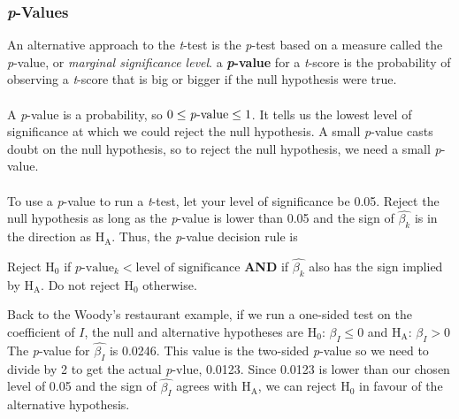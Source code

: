 \documentclass[11pt]{article}
\begin{document}
\subsubsection{\textit{p}-Values}
An alternative approach to the \textit{t}-test is the 	\textit{p}-test based on a measure called the 	\textit{p}-value, or \textit{marginal significance level}. a \textbf{\textit{p}-value} for a \textit{t}-score is the probability of observing a \textit{t}-score that is big or bigger if the null hypothesis were true. \\ \\
A \textit{p}-value is a probability, so $0 \leq \text{\textit{p}-value} \leq 1$. It tells us the lowest level of significance at which we could reject the null hypothesis. A small \textit{p}-value casts doubt on the null hypothesis, so to reject the null hypothesis, we need a small \textit{p}-value.\\ \\
To use a \textit{p}-value to run a \textit{t}-test, let your level of significance be 0.05. Reject the null hypothesis as long as the \textit{p}-value is lower than 0.05 and the sign of $\hat{\beta_k}$ is in the direction as H$_\text{A}$. Thus, the \textit{p}-value decision rule is
\begin{framed}Reject H$_0$ if  $p\text{-value}_k < \text{level of significance}$ \textbf{AND} if $\hat{\beta_k}$ also has the sign implied by H$_\text{A}$. Do not reject H$_0$ otherwise.
\end{framed}
Back to the Woody's restaurant example, if we run a one-sided test on the coefficient of $I$, the null and alternative hypotheses are  $\text{H}_0\text{: }\beta_I \leq 0$ and $\text{H}_\text{A}\text{: } \beta_I > 0$ The \textit{p}-value for $\hat{\beta_I}$ is 0.0246. This value is the two-sided \textit{p}-value so we need to divide by 2 to get the actual \textit{p}-vlue, 0.0123. Since 0.0123 is lower than our chosen level of 0.05 and the sign of $\hat{\beta_I}$ agrees with H$_\text{A}$, we can reject H$_0$ in favour of the alternative hypothesis.
\end{document}
